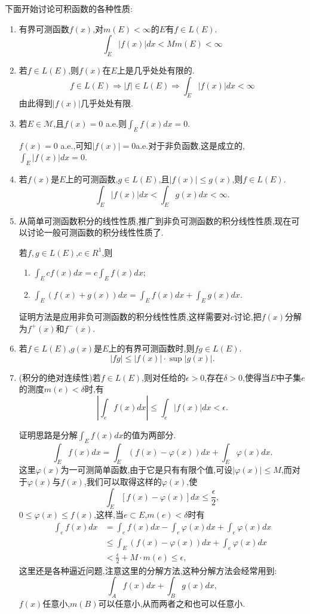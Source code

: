 \documentclass[12pt,a4paper,openany]{book}
\begin{document}
下面开始讨论可积函数的各种性质:
\begin{enumerate}
\item 有界可测函数$f(x)$,对$m(E)<\infty$的$E$有$f \in L(E)$.
\[
\int_{E}{|f(x)|dx} < Mm(E) < \infty
\]

\item 若$f \in L(E)$,则$f(x)$在$E$上是几乎处处有限的.
\[
f \in L(E) \Rightarrow |f| \in L(E) \Rightarrow \int_{E}{|f(x)|dx} < \infty
\]
由此得到$|f(x)|$几乎处处有限.

\item 若$E \in \mathcal{M}$,且$f(x)=0$ a.e.则$\int_{E}{f(x)dx}=0$.

$f(x)=0$ a.e.,可知$|f(x)|=0$a.e.对于非负函数,这是成立的,$\int_{E}{|f(x)|dx} = 0$.

\item 若$f(x)$是$E$上的可测函数,$g \in L(E)$,且$|f(x)| \le g(x)$,则$f \in L(E)$.
\[
\int_{E}{|f(x)|dx} < \int_{E}{g(x)dx} < \infty.
\]

\item 从简单可测函数积分的线性性质,推广到非负可测函数的积分线性性质,现在可以讨论一般可测函数的积分线性性质了.

若$f,g \in L(E)$,$c \in R^1$,则
\begin{enumerate}
\item $\int_{E}{cf(x)dx} = c\int_{E}{f(x)dx}$;
\item $\int_{E}{(f(x)+g(x))dx} = \int_{E}{f(x)dx} + \int_{E}{g(x)dx}$.
\end{enumerate}
证明方法是应用非负可测函数的积分线性性质,这样需要对$c$讨论,把$f(x)$分解为$f^+(x)$和$f^-(x)$.

\item 若$f \in L(E)$,$g(x)$是$E$上的有界可测函数时,则$fg \in L(E)$.
\[
|fg| \le |f(x)| \cdot \sup|g(x)|.
\]

\item (积分的绝对连续性)若$f \in L(E)$,则对任给的$\epsilon>0$,存在$\delta>0$,使得当$E$中子集$e$的测度$m(e)<\delta$时,有
\[
|\int_{e}{f(x)dx}| \le \int_{e}{|f(x)|dx} < \epsilon.
\]

证明思路是分解$\int_{E}{f(x)dx}$的值为两部分.
\[
\int_{E}{f(x)dx} = \int_{E}{(f(x)-\varphi(x))dx} + \int_{E}{\varphi(x)dx}.
\]
这里$\varphi(x)$为一可测简单函数,由于它是只有有限个值,可设$|\varphi(x)|\le M$,而对于$\varphi(x)$与$f(x)$,我们可以取得这样的$\varphi(x)$,使
\[
\int_{E}{[f(x)-\varphi(x)]dx} \le \frac{\epsilon}{2},
\]
$0 \le \varphi(x) \le f(x)$,这样,当$e \subset E$,$m(e)<\delta$时有
\[
\begin{aligned}
\int_{e}{f(x)dx} &= \int_{e}{f(x)dx} - \int_{e}{\varphi(x)dx} + \int_{e}{\varphi(x)dx} \\
&\le \int_{E}{(f(x)-\varphi(x))dx} + \int_{e}{\varphi(x)dx} \\
&<\frac{\epsilon}{2} + M \cdot m(e) \le \epsilon,
\end{aligned}
\]
这里还是各种逼近问题,注意这里的分解方法,这种分解方法会经常用到:
\[
\int_{A}{f(x)dx} + \int_{B}{g(x)dx},
\]
$f(x)$任意小,$m(B)$可以任意小,从而两者之和也可以任意小.


\end{enumerate}
\end{document}
